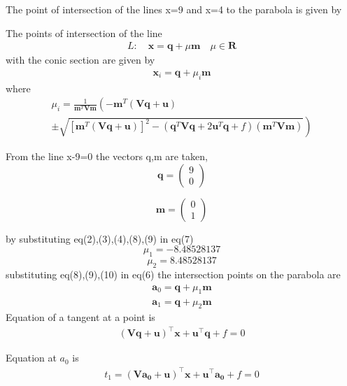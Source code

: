 \documentclass[journal,10pt,twocolumn]{article}
\let\vec\mathbf
\newcommand{\myvec}[1]{\ensuremath{\begin{pmatrix}#1\end{pmatrix}}}
\providecommand{\brak}[1]{\ensuremath{\left(#1\right)}}
\providecommand{\lbrak}[1]{\ensuremath{\left(#1\right.}}
\providecommand{\rbrak}[1]{\ensuremath{\left.#1\right)}}
\providecommand{\sbrak}[1]{\ensuremath{{}\left[#1\right]}}
\begin{document}
The point of intersection of the lines x=9 and x=4 to the parabola is given by



The points of intersection of the line 
\begin{align}
  L: \quad \vec{x} = \vec{q} + \mu \vec{m} \quad \mu \in \mathbf{R}
\label{eq:conic_tangent}
\end{align}
with the conic section are given by
\begin{align}
\vec{x}_i = \vec{q} + \mu_i \vec{m}
\label{eq:conic_tangent_pts}
\end{align}
%
where
{\tiny
\begin{multline}
\mu_i = \frac{1}
{
\vec{m}^T\vec{V}\vec{m}
}
\lbrak{-\vec{m}^T\brak{\vec{V}\vec{q}+\vec{u}}}
\\
\pm
\rbrak{\sqrt{
\sbrak{
\vec{m}^T\brak{\vec{V}\vec{q}+\vec{u}}
}^2
-
\brak
{
\vec{q}^T\vec{V}\vec{q} + 2\vec{u}^T\vec{q} +f
}
\brak{\vec{m}^T\vec{V}\vec{m}}
}
}
\label{eq:tangent_roots}
\end{multline}
}



From the line x-9=0 the vectors q,m are taken,
\begin{equation}
\vec{q}=\myvec{9\\0}
\end{equation}

\begin{equation}
\vec{m}=\myvec{0\\1}
\end{equation}

by substituting eq(2),(3),(4),(8),(9) in eq(7)
\begin{equation}
\mu_1=-8.48528137
\end{equation}
\begin{equation}
\mu_2=8.48528137
\end{equation}
substituting eq(8),(9),(10) in eq(6) the intersection points on the parabola are
\begin{align}
\vec{a}_0 = \vec{q}+ \mu_1 \vec{m}
\label{eq:conic_tangent_pts}
\end{align}
\begin{align}
\vec{a}_1 = \vec{q}+ \mu_2 \vec{m}
\label{eq:conic_tangent_pts}
\end{align}
Equation of a tangent at a point is 
\begin{align}
({\vec{V}\vec{q}+\vec{u}})^{\top}\vec{x}+\vec{u}^{\top}\vec{q}+f=0
\end{align}

Equation at $a_0$ is 
\begin{align}
t_1 =({\vec{V}\vec{a_0}+\vec{u}})^{\top}\vec{x}+\vec{u}^{\top}\vec{a_0}+f=0
\end{align}
\end{document}
